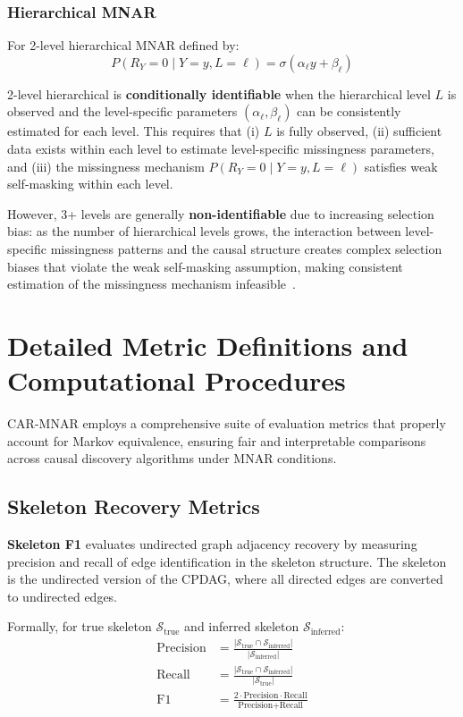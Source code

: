 \documentclass[runningheads]{llncs}
\begin{document}
\subsubsection{Hierarchical MNAR}

For 2-level hierarchical MNAR defined by:
\begin{equation}
  P(R_Y = 0 \mid Y = y, L = \ell) = \sigma(\alpha_\ell y + \beta_\ell)
  \label{eq:hierarchical_sm}
\end{equation}

2-level hierarchical is \textbf{conditionally identifiable} when the hierarchical level $L$ is observed and the level-specific parameters $(\alpha_\ell, \beta_\ell)$ can be consistently estimated for each level. This requires that (i) $L$ is fully observed, (ii) sufficient data exists within each level to estimate level-specific missingness parameters, and (iii) the missingness mechanism $P(R_Y = 0 \mid Y = y, L = \ell)$ satisfies weak self-masking within each level. 

However, 3+ levels are generally \textbf{non-identifiable} due to increasing selection bias: as the number of hierarchical levels grows, the interaction between level-specific missingness patterns and the causal structure creates complex selection biases that violate the weak self-masking assumption, making consistent estimation of the missingness mechanism infeasible~\cite{little2019statistical}.

\section{Detailed Metric Definitions and Computational Procedures}

CAR-MNAR employs a comprehensive suite of evaluation metrics that properly account for Markov equivalence, ensuring fair and interpretable comparisons across causal discovery algorithms under MNAR conditions.

\subsection{Skeleton Recovery Metrics}

\textbf{Skeleton F1} evaluates undirected graph adjacency recovery by measuring precision and recall of edge identification in the skeleton structure. The skeleton is the undirected version of the CPDAG, where all directed edges are converted to undirected edges. 

Formally, for true skeleton $\mathcal{S}_{\text{true}}$ and inferred skeleton $\mathcal{S}_{\text{inferred}}$:
\begin{align}
\text{Precision} &= \frac{|\mathcal{S}_{\text{true}} \cap \mathcal{S}_{\text{inferred}}|}{|\mathcal{S}_{\text{inferred}}|} \\
\text{Recall} &= \frac{|\mathcal{S}_{\text{true}} \cap \mathcal{S}_{\text{inferred}}|}{|\mathcal{S}_{\text{true}}|} \\
\text{F1} &= \frac{2 \cdot \text{Precision} \cdot \text{Recall}}{\text{Precision} + \text{Recall}}
\end{align}
\end{document}
